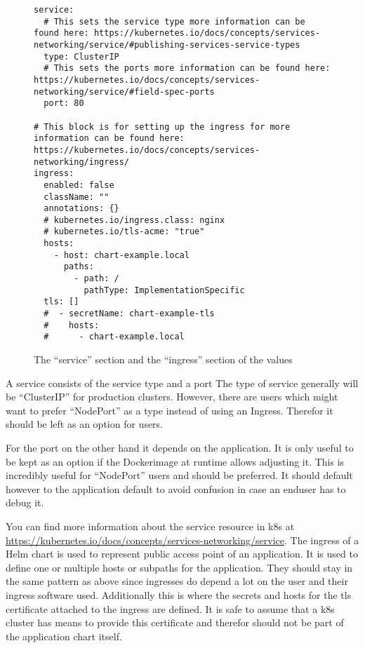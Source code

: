 \begin{figure}[h]
\begin{verbatim}
service:
  # This sets the service type more information can be found here: https://kubernetes.io/docs/concepts/services-networking/service/#publishing-services-service-types
  type: ClusterIP
  # This sets the ports more information can be found here: https://kubernetes.io/docs/concepts/services-networking/service/#field-spec-ports
  port: 80

# This block is for setting up the ingress for more information can be found here: https://kubernetes.io/docs/concepts/services-networking/ingress/
ingress:
  enabled: false
  className: ""
  annotations: {}
  # kubernetes.io/ingress.class: nginx
  # kubernetes.io/tls-acme: "true"
  hosts:
    - host: chart-example.local
      paths:
        - path: /
          pathType: ImplementationSpecific
  tls: []
  #  - secretName: chart-example-tls
  #    hosts:
  #      - chart-example.local
\end{verbatim}
\caption{The \enquote{service} section and the \enquote{ingress} section of the \gls{values}}\label{code:service_and_ingress_section}
\end{figure}

A service consists of the service type and a port
The type of service generally will be \enquote{ClusterIP} for production clusters.
However, there are users which might want to prefer \enquote{NodePort} as a type instead of using an Ingress.
Therefor it should be left as an option for users.

For the port on the other hand it depends on the application.
It is only useful to be kept as an option if the Dockerimage at runtime allows adjusting it.
This is incredibly useful for \enquote{NodePort} users and should be preferred.
It should default however to the application default to avoid confusion in case an enduser has to debug it.

You can find more information about the service resource in \gls{k8s} at \url{https://kubernetes.io/docs/concepts/services-networking/service}.
\bigskip
The ingress of a Helm chart is used to represent public access point of an application.
It is used to define one or multiple hosts or subpaths for the application.
They should stay in the same pattern as above since ingresses do depend a lot on the user and their ingress software used.
Additionally this is where the secrets and hosts for the tls certificate attached to the ingress are defined.
It is safe to assume that a \gls{k8s} cluster has means to provide this certificate and therefor should not be part of the application chart itself.

